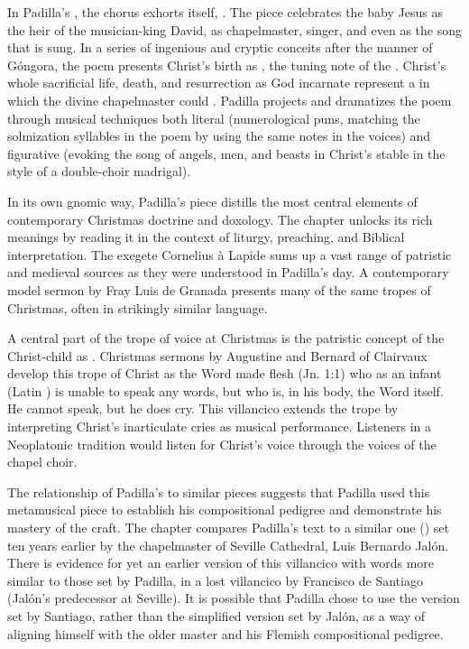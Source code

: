 \documentclass[tt]{vcbook-proposal}
\begin{document}
In Padilla's , the chorus exhorts itself, .
The piece celebrates the baby Jesus as the heir of the musician-king David, as chapelmaster, singer, and even as the song that is sung.
In a series of ingenious and cryptic conceits after the manner of Góngora, the poem presents Christ's birth as , the tuning note of the .
Christ's whole sacrificial life, death, and resurrection as God incarnate represent a  in which the divine chapelmaster could .
Padilla projects and dramatizes the poem through musical techniques both literal (numerological puns, matching the solmization syllables in the poem by using the same notes in the voices) and figurative (evoking the song of angels, men, and beasts in Christ's stable in the style of a double-choir madrigal).

In its own gnomic way, Padilla's piece distills the most central elements of contemporary Christmas doctrine and doxology.
The chapter unlocks its rich meanings by reading it in the context of liturgy, preaching, and Biblical interpretation.
The exegete Cornelius à Lapide sums up a vast range of patristic and medieval sources as they were understood in Padilla's day. 
A contemporary model sermon by Fray Luis de Granada presents many of the same tropes of Christmas, often in strikingly similar language.

A central part of the trope of voice at Christmas is the patristic concept of the Christ-child as . 
Christmas sermons by Augustine and Bernard of Clairvaux develop this trope of Christ as the Word made flesh (Jn. 1:1) who as an infant (Latin ) is unable to speak any words, but who is, in his body, the Word itself.
He cannot speak, but he does cry.
This villancico extends the trope by interpreting Christ's inarticulate cries as musical performance.
Listeners in a Neoplatonic tradition would listen for Christ's voice through the voices of the chapel choir.

The relationship of Padilla's  to similar pieces suggests that Padilla used this metamusical piece to establish his compositional pedigree and demonstrate his mastery of the craft.
The chapter compares Padilla's text to a similar one () set ten years earlier by the chapelmaster of Seville Cathedral, Luis Bernardo Jalón.
There is evidence for yet an earlier version of this villancico with words more similar to those set by Padilla, in a lost villancico by Francisco de Santiago (Jalón's predecessor at Seville).
It is possible that Padilla chose to use the version set by Santiago, rather than the simplified version set by Jalón, as a way of aligning himself with the older master and his Flemish compositional pedigree.
\end{document}
